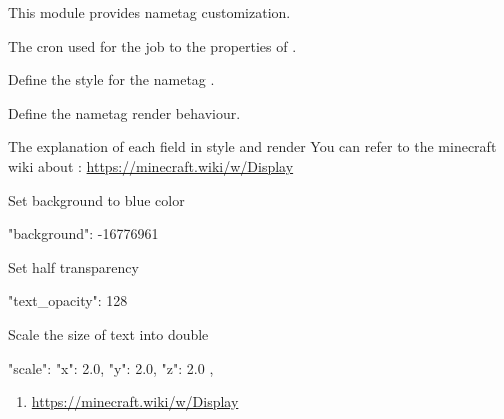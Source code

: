 This module provides nametag customization.

The cron used for the job to  the properties of .

Define the style for the nametag .

Define the nametag render behaviour.

\begin{note}{The explanation of each field in style and render}
    You can refer to the minecraft wiki about : \url{https://minecraft.wiki/w/Display}
\end{note}

\begin{example}{Set background to blue color}
    \begin{json}
        "background": -16776961
    \end{json}
\end{example}

\begin{example}{Set half transparency}
    \begin{json}
        "text_opacity": 128
    \end{json}
\end{example}

\begin{example}{Scale the size of text into double}
    \begin{json}
        "scale": {
            "x": 2.0,
            "y": 2.0,
            "z": 2.0
        },
    \end{json}

\end{example}

\begin{enumerate}
    \item \url{https://minecraft.wiki/w/Display}
\end{enumerate}